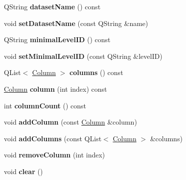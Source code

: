 \begin{DoxyCompactItemize}
\item 
\mbox{\label{class_dataset_definition_a9223d19e6a1aaf65bfaa13bec08fc4e3}} 
Q\+String {\bfseries dataset\+Name} () const
\item 
\mbox{\label{class_dataset_definition_a1dd20b6c722b1c5399be04e9d0361498}} 
void {\bfseries set\+Dataset\+Name} (const Q\+String \&name)
\item 
\mbox{\label{class_dataset_definition_aee848bad12756ef7115810fbd1b709a0}} 
Q\+String {\bfseries minimal\+Level\+ID} () const
\item 
\mbox{\label{class_dataset_definition_ac4e8fa3e80f34b081d902a8e9877daf2}} 
void {\bfseries set\+Minimal\+Level\+ID} (const Q\+String \&level\+ID)
\item 
\mbox{\label{class_dataset_definition_ab1ad323bfec8706f2a90f0336c293a98}} 
Q\+List$<$ \hyperlink{class_dataset_definition_1_1_column}{Column} $>$ {\bfseries columns} () const
\item 
\mbox{\label{class_dataset_definition_a19c88f8b5ffd35d58577ec58a24cc98f}} 
\hyperlink{class_dataset_definition_1_1_column}{Column} {\bfseries column} (int index) const
\item 
\mbox{\label{class_dataset_definition_aae7a5f778e90ae1dcde85e3e5aeb443a}} 
int {\bfseries column\+Count} () const
\item 
\mbox{\label{class_dataset_definition_af4926f0eecf5ec5ff5a6dc3ef65f0752}} 
void {\bfseries add\+Column} (const \hyperlink{class_dataset_definition_1_1_column}{Column} \&column)
\item 
\mbox{\label{class_dataset_definition_a3a68d77df0e5af3e3e4a34116ebcfcd8}} 
void {\bfseries add\+Columns} (const Q\+List$<$ \hyperlink{class_dataset_definition_1_1_column}{Column} $>$ \&columns)
\item 
\mbox{\label{class_dataset_definition_a376dbf07084b0059cec161f05866e657}} 
void {\bfseries remove\+Column} (int index)
\item 
\mbox{\label{class_dataset_definition_a1287fda44b0a89e8f589a001a72dc8a7}} 
void {\bfseries clear} ()
\end{DoxyCompactItemize}


